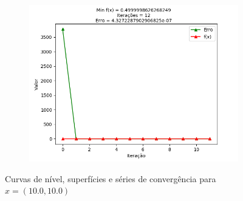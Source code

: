 \documentclass[a4paper, 12pt]{article}
\begin{document}
\begin{figure}[H]
\begin{subfigure}{0.3\textwidth}
  \includegraphics[width=\linewidth]{1/D/x10x10/convergencia.png}
\end{subfigure}
\caption{Curvas de nível, superfícies e séries de convergência para $x = (10.0, 10.0)$}
\label{fig:x10x10}
\end{figure}
\end{document}
